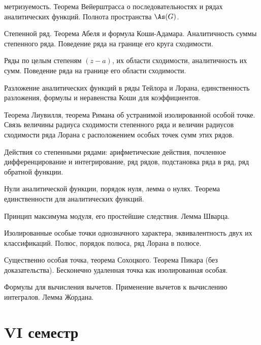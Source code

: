 \documentclass[a4paper]{article}
\begin{document}
\begin{nums}{-2}
      метризуемость. Теорема Вейерштрасса о последовательностях и рядах аналитических функций. Полнота
      пространства $\As(G)$.
\item Степенной ряд. Теорема Абеля и формула Коши-Адамара. Аналитичность суммы степенного ряда. Поведение
      ряда на границе его круга сходимости.
\item Ряды по целым степеням $(z-a)$, их области сходимости, аналитичность их сумм. Поведение ряда на границе
      его области сходимости.
\item Разложение аналитических функций в ряды Тейлора и Лорана, единственность разложения, формулы и
      неравенства Коши для коэффициентов.
\item Теорема Лиувилля, теорема Римана об устранимой изолированной особой точке. Связь величины радиуса
      сходимости степенного ряда и величин радиусов сходимости ряда Лорана с расположением особых точек сумм этих рядов.
\item Действия со степенными рядами: арифметические действия, почленное дифференцирование и интегрирование,
      ряд рядов, подстановка ряда в ряд, ряд обратной функции.
\item Нули аналитической функции, порядок нуля, лемма о нулях. Теорема единственности для аналитических функций.
\item Принцип максимума модуля, его простейшие следствия. Лемма Шварца.
\item Изолированные особые точки  однозначного характера,  эквивалентность двух их классификаций. Полюс,
      порядок полюса, ряд Лорана в полюсе.
\item Существенно особая точка, теорема Сохоцкого. Теорема Пикара (без доказательства). Бесконечно удаленная
      точка как изолированная особая.
\item Формулы для вычисления вычетов. Применение вычетов к вычислению интегралов. Лемма Жордана.
\end{nums}

\pagebreak

\section*{VI семестр}
\end{document}
